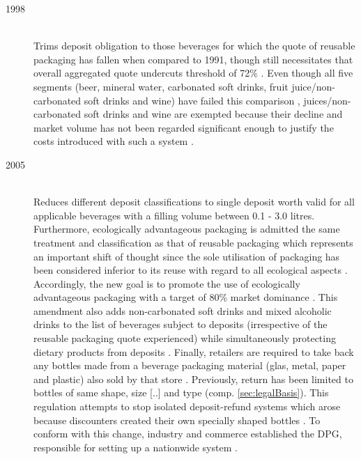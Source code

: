 \begin{description}
	\item[1998]
	\hfill \\
	Trims deposit obligation to those beverages for which the quote of reusable packaging has fallen when compared to 1991, though still necessitates that overall aggregated quote undercuts threshold of 72\% \cite[pp.~142]{Flanderka 1999}. Even though all five segments (beer, mineral water, carbonated soft drinks, fruit juice/non-carbonated soft drinks and wine) have failed this comparison \cite[p.~1]{BMU 2010a}, juices/non-carbonated soft drinks and wine are exempted because their decline and market volume has not been regarded significant enough to justify the costs introduced with such a system \cite[pp.~1]{BMU 2002} \cite[pp.~6,~9]{Hartlep2011Recycling}. 
	

	\item[2005]
	\hfill \\
	Reduces different deposit classifications to single deposit worth  valid for all applicable beverages with a filling volume between 0.1 - 3.0 litres. Furthermore, \gls{ecologically advantageous packaging} is admitted the same treatment and classification as that of reusable packaging which represents an important shift of thought since the sole utilisation of packaging has been considered inferior to its reuse with regard to all ecological aspects \cite[p.~1]{BMU 2010c}. Accordingly, the new goal is to promote the use of ecologically advantageous packaging with a target of 80\% market dominance \cite{verpackV2008}. This amendment also adds non-carbonated soft drinks and mixed alcoholic drinks to the list of beverages subject to deposits (irrespective of the reusable packaging quote experienced) while simultaneously protecting dietary products from deposits \cite[p.1408]{BGBl. 2005} \cite[p.~171]{Flanderka/Stroetmann 2009}. Finally, retailers are required to take back any bottles made from a beverage packaging material (glas, metal, paper and plastic) also sold by that store \cite[p.~1]{BMU 2010c}. Previously, return has been limited to bottles of same shape, size [..] and type (comp. \ref{sec:legalBasis}). This regulation attempts to stop isolated deposit-refund systems which arose because discounters created their own specially shaped bottles \cite[p.~168]{Flanderka/Stroetmann 2009}. To conform with this change, industry and commerce established the \ac{DPG}, responsible for setting up a nationwide system \cite[p.~1]{BMU 2010c}.
	

\end{description}
